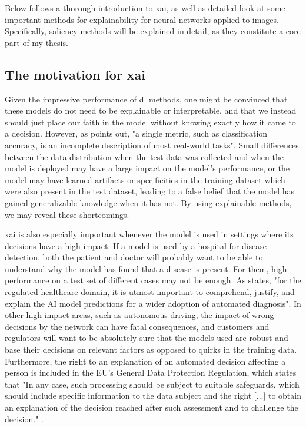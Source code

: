 \documentclass[UKenglish]{uiomasterthesis} %
\theoremstyle{definition}
\begin{document}
Below follows a thorough introduction to \ac{xai}, as well as detailed look at some important methods for explainability for neural networks applied to images. Specifically, saliency methods will be explained in detail, as they constitute a core part of my thesis.

\subsection{The motivation for \ac{xai}}

Given the impressive performance of \ac{dl} methods, one might be convinced that these models do not need to be explainable or interpretable, and that we instead should just place our faith in the model without knowing exactly how it came to a decision. However, as \cite{doshivelez} points out, "a single metric, such as classification accuracy, is an incomplete description of most real-world tasks". Small differences between the data distribution when the test data was collected and when the model is deployed may have a large impact on the model's performance, or the model may have learned artifacts or specificities in the training dataset which were also present in the test dataset, leading to a false belief that the model has gained generalizable knowledge when it has not. By using explainable methods, we may reveal these shortcomings.

\ac{xai} is also especially important whenever the model is used in settings where its decisions have a high impact. If a model is used by a hospital for disease detection, both the patient and doctor will probably want to be able to understand why the model has found that a disease is present. For them, high performance on a test set of different cases may not be enough. As \cite{xaisurvey} states, "for the regulated healthcare domain, it is utmost important to comprehend, justify, and explain the AI model predictions for a wider adoption of automated diagnosis". In other high impact areas, such as autonomous driving, the impact of wrong decisions by the network can have fatal consequences, and customers and regulators will want to be absolutely sure that the models used are robust and base their decisions on relevant factors as opposed to quirks in the training data. Furthermore, the right to an explanation of an automated decision affecting a person is included in the EU's General Data Protection Regulation, which states that "In any case, such processing should be subject to suitable safeguards, which should include specific information to the data subject and the right [...] to obtain an explanation of the decision reached after such assessment and to challenge the decision." \cite{gdpr}.
\end{document}
